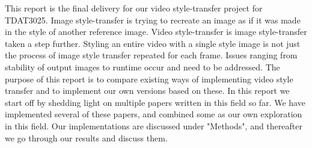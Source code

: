 This report is the final delivery for our video style-transfer project for TDAT3025. Image style-transfer is trying to recreate an image as if it was made in the style of another reference image. Video style-transfer is image style-transfer taken a step further. Styling an entire video with a single style image is not just the process of image style transfer repeated for each frame. Issues ranging from stability of output images to runtime occur and need to be addressed. The purpose of this report is to compare existing ways of implementing video style transfer and to implement our own versions based on these. In this report we start off by shedding light on multiple papers written in this field so far. We have implemented several of these papers, and combined some as our own exploration in this field. Our implementations are discussed under "Methods", and thereafter we go through our results and discuss them.